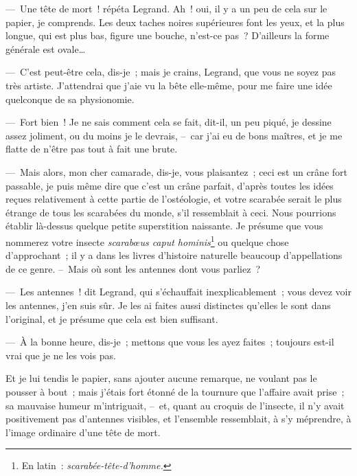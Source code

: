 \documentclass[french,twoside]{book} %
\begin{document}
— Une tête de mort ! répéta Legrand. Ah ! oui, il y a un peu de cela sur le papier, je comprends. Les deux taches noires supérieures font les yeux, et la plus longue, qui est plus bas, figure une bouche, n’est-ce pas ? D’ailleurs la forme générale est ovale…\par
— C’est peut-être cela, dis-je ; mais je crains, Legrand, que vous ne soyez pas très artiste. J’attendrai que j’aie vu la bête elle-même, pour me faire une idée quelconque de sa physionomie.\par
— Fort bien ! Je ne sais comment cela se fait, dit-il, un peu piqué, je dessine assez joliment, ou du moins je le devrais, – car j’ai eu de bons maîtres, et je me flatte de n’être pas tout à fait une brute.\par
— Mais alors, mon cher camarade, dis-je, vous plaisantez ; ceci est un crâne fort passable, je puis même dire que c’est un crâne parfait, d’après toutes les idées reçues relativement à cette partie de l’ostéologie, et votre scarabée serait le plus étrange de tous les scarabées du monde, s’il ressemblait à ceci. Nous pourrions établir là-dessus quelque petite superstition naissante. Je présume que vous nommerez votre insecte \emph{scarabœus caput hominis}\footnote{En latin : \emph{scarabée-tête-d’homme.}} ou quelque chose d’approchant ; il y a dans les livres d’histoire naturelle beaucoup d’appellations de ce genre. – Mais où sont les antennes dont vous parliez ?\par
— Les antennes ! dit Legrand, qui s’échauffait inexplicablement ; vous devez voir les antennes, j’en suis sûr. Je les ai faites aussi distinctes qu’elles le sont dans l’original, et je présume que cela est bien suffisant.\par
— À la bonne heure, dis-je ; mettons que vous les ayez faites ; toujours est-il vrai que je ne les vois pas.\par
Et je lui tendis le papier, sans ajouter aucune remarque, ne voulant pas le pousser à bout ; mais j’étais fort étonné de la tournure que l’affaire avait prise ; sa mauvaise humeur m’intriguait, – et, quant au croquis de l’insecte, il n’y avait positivement pas d’antennes visibles, et l’ensemble ressemblait, à s’y méprendre, à l’image ordinaire d’une tête de mort.\par
\end{document}
